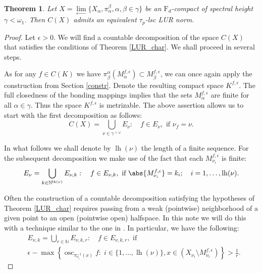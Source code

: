 \documentclass[11pt]{article}
\newcommand{\N}{\mathbb{N}}
\DeclareMathOperator{\osc}{osc}
\DeclareMathOperator{\lgth}{lh}
\newtheorem{theorem}{Theorem}[section]
\theoremstyle{definition}
\theoremstyle{remark}
\begin{document}
\begin{theorem}\label{main_thm}
	Let $X = \lim\limits_{\leftarrow} \{X_\alpha, \pi_\alpha^\beta, \alpha, \beta \in \gamma\}$ be an $\mathrm{F}_d$-compact of spectral height $\gamma < \omega_1$. Then $C(X)$ admits an equivalent $\tau_p$-lsc LUR norm.
\end{theorem} 

\begin{proof}
	Let $\epsilon > 0$. We will find a countable decomposition of the space $C(X)$ that satisfies the conditions of Theorem \ref{LUR_char}. We shall proceed in several steps.
	
	As for any $f \in C(K)$ we have $\pi^\alpha_\beta\left(M^{f,\epsilon}_\alpha\right) \subset M^{f,\epsilon}_\beta$, we can once again apply the construction from Section \ref{constr}. Denote the resulting compact space $K^{f, \epsilon}$. The full closedness of the bonding mappings implies that the sets $M^{f,\epsilon}_\alpha$ are finite for all $\alpha \in \gamma$. Thus the space $K^{f,\epsilon}$ is metrizable. The above assertion allows us to start with the first decomposition as follows:
	\begin{equation} \label{dec1}
		C(X) = \bigcup_{\nu \in \gamma^{<\omega}} E_\nu: \quad f \in E_\nu, \text{ if } \nu_f = \nu.
	\end{equation}
	
	In what follows we shall denote by $\lgth(\nu)$ the length of a finite sequence. For the subsequent decomposition we make use of the fact that each $M^{f, \epsilon}_{\nu_i}$ is finite:
	\begin{equation} \label{dec2}
		E_\nu = \bigcup_{k \in \N^{\lgth(\nu)}} E_{\nu,k}: \quad f \in E_{\nu,k}, \text{ if } \abs{M^{f,\epsilon}_{\nu_i}} = k_i; \quad i = 1, \dots, \lgth(\nu). 
	\end{equation}
	
	Often the construction of a countable decomposition satisfying the hypotheses of Theorem \ref{LUR_char} requires passing from a weak (pointwise) neighborhood of a given point to an open (pointwise open) halfspace. In this note we will do this with a technique similar to the one in \cite[Lemma 4.22]{motv}. In particular, we have the following:
	\begin{equation}
		\begin{aligned}\label{dec3}
			&E_{\nu, k} = \bigcup_{r \in \N} E_{\nu, k, r}: \quad f \in E_{\nu, k, r}, \text{ if }\\
			&\epsilon - \max\left\{\osc_{\pi_{\nu_i}^{-1}(x)} f: \;  i \in \{1, \dots, \lgth(\nu)\}, x \in \left(X_{\nu_i} \setminus M^{f, \epsilon}_{\nu_i}\right)\right\}> \frac{1}{r}.
		\end{aligned}
	\end{equation}
	

\end{proof}
\end{document}
